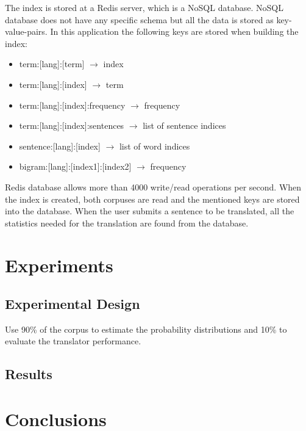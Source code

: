 \documentclass[12pt]{article}
\begin{document}
The index is stored at a Redis server, which is a NoSQL database.
NoSQL database does not have any specific schema but all the data is stored as key-value-pairs.
In this application the following keys are stored when building the index:
\begin{itemize}
	\item term:[lang]:[term] $\rightarrow$ index
	\item term:[lang]:[index] $\rightarrow$ term
	\item term:[lang]:[index]:frequency $\rightarrow$ frequency
	\item term:[lang]:[index]:sentences $\rightarrow$ list of sentence indices
	\item sentence:[lang]:[index] $\rightarrow$ list of word indices
	\item bigram:[lang]:[index1]:[index2] $\rightarrow$ frequency
\end{itemize}

Redis database allows more than 4000 write/read operations per second.
When the index is created, both corpuses are read and the mentioned keys are stored into the database.
When the user submits a sentence to be translated, all the statistics needed for the translation are found from the database.


\section{Experiments}

\subsection{Experimental Design}
Use 90\% of the corpus to estimate the probability distributions and 10\% to evaluate the translator performance.


\subsection{Results}



\section{Conclusions}



\end{document}
